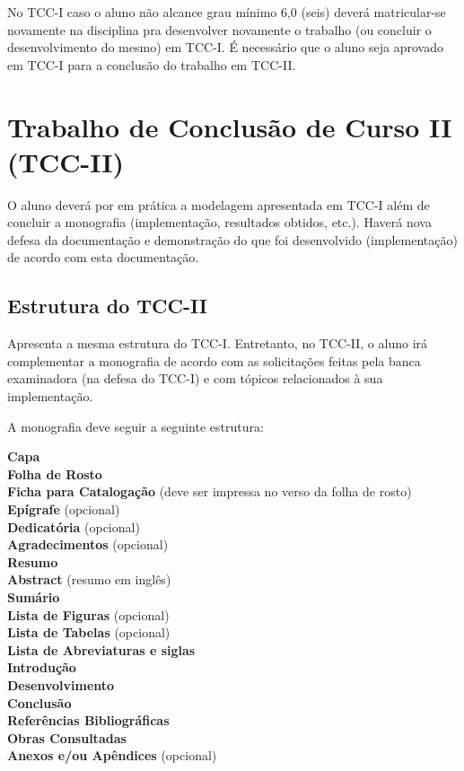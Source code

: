 No TCC-I caso o aluno não alcance grau mínimo 6,0 (seis) deverá matricular-se novamente na disciplina pra desenvolver novamente o trabalho (ou concluir o desenvolvimento do mesmo)  em TCC-I.
É necessário que o aluno seja aprovado em TCC-I para a conclusão do trabalho em TCC-II. 


\section{Trabalho de Conclusão de Curso II (TCC-II)}

O aluno deverá por em prática a modelagem apresentada em TCC-I além de concluir a monografia (implementação, resultados obtidos, etc.). Haverá nova defesa da documentação e demonstração do que foi desenvolvido (implementação) de acordo com esta documentação.


\subsection{Estrutura do TCC-II}

Apresenta a mesma estrutura do TCC-I. Entretanto, no TCC-II, o aluno irá complementar a monografia de acordo com as solicitações feitas pela banca examinadora (na defesa do TCC-I) e com tópicos relacionados à sua implementação. 

A monografia deve seguir a seguinte estrutura: 

	\indent \textbf{Capa} \\
	\indent \textbf{Folha de Rosto} \\
	\indent \textbf{Ficha para Catalogação} (deve ser impressa no verso da folha de rosto) \\
	\indent \textbf{Epígrafe} (opcional) \\
	\indent \textbf{Dedicatória} (opcional) \\
	\indent \textbf{Agradecimentos} (opcional) \\
	\indent \textbf{Resumo} \\
	\indent \textbf{Abstract} (resumo em inglês) \\
	\indent \textbf{Sumário} \\
	\indent \textbf{Lista de Figuras} (opcional) \\
	\indent \textbf{Lista de Tabelas} (opcional) \\
	\indent \textbf{Lista de Abreviaturas e siglas} \\
	\indent \textbf{Introdução} \\
	\indent \textbf{Desenvolvimento} \\
	\indent \textbf{Conclusão} \\
	\indent \textbf{Referências Bibliográficas} \\
	\indent \textbf{Obras Consultadas} \\
	\indent \textbf{Anexos e/ou Apêndices} (opcional) \\\\


